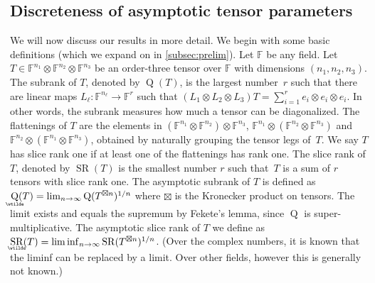 \documentclass{daj}
\DeclareMathOperator{\subrank}{Q}
\DeclareMathOperator{\slicerank}{SR}
\DeclareMathOperator{\asympsubrank}{\underaccent{\wtilde}{Q}}
\DeclareMathOperator{\asympslicerank}{\underaccent{\wtilde}{SR}}
\newcommand{\FF}{\mathbb{F}}
\begin{document}
%

%

%

\subsection{Discreteness of asymptotic tensor parameters}

We will now discuss our results in more detail. We begin with some basic definitions (which we expand on in \autoref{subsec:prelim}).
Let $\FF$ be any field. Let $T \in \FF^{n_1} \otimes \FF^{n_2} \otimes \FF^{n_3}$ be an order-three tensor over $\FF$ with dimensions $(n_1, n_2, n_3)$. The subrank of $T$, denoted by $\subrank(T)$, is the largest number~$r$ such that there are linear maps $L_\ell : \FF^{n_\ell} \to \FF^r$ such that $(L_1 \otimes L_2\otimes L_3)T = \sum_{i=1}^r e_i \otimes e_i \otimes e_i$. In other words, the subrank measures how much a tensor can be diagonalized. 
The flattenings of $T$ are the elements in $(\FF^{n_1} \otimes \FF^{n_2}) \otimes \FF^{n_3}$, $\FF^{n_1} \otimes (\FF^{n_2} \otimes \FF^{n_3})$ and $\FF^{n_2} \otimes (\FF^{n_1} \otimes \FF^{n_3})$, obtained by naturally grouping the tensor legs of~$T$. 
We say $T$ has slice rank one if at least one of the flattenings has rank one. The slice rank of $T$, denoted by $\slicerank(T)$ is the smallest number $r$ such that~$T$ is a sum of $r$ tensors with slice rank one.
The asymptotic subrank of $T$ is defined as $\asympsubrank(T) = \lim_{n \to \infty} \subrank(T^{\boxtimes n})^{1/n}$ where $\boxtimes$ is the Kronecker product on tensors. The limit exists and equals the supremum by Fekete's lemma, since $\subrank$ is super-multiplicative. The asymptotic slice rank of $T$ we define as $\asympslicerank(T) = \liminf_{n\to\infty} \slicerank(T^{\boxtimes n})^{1/n}$. (Over the complex numbers, it is known that the liminf can be replaced by a limit. Over other fields, however this is generally not known.) 

\end{document}
